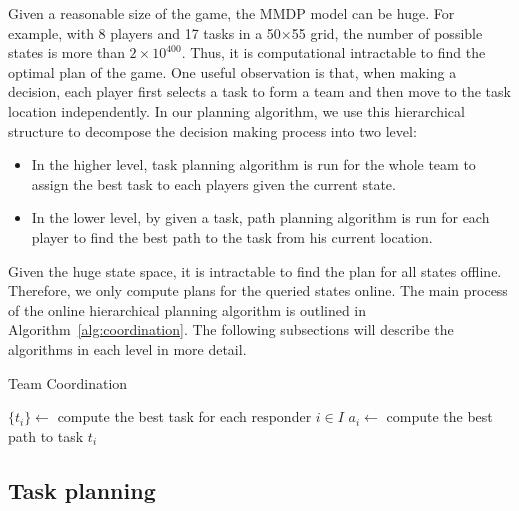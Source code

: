 Given a reasonable size of the game, the MMDP model can be huge.
For example, with 8 players and 17 tasks in a 50$\times$55 grid,
the number of possible states is more than $2\times 10^{400}$.
Thus, it is computational intractable to find the optimal plan of
the game. One useful observation is that, when making a decision,
each player first selects a task to form a team and then move to
the task location independently. In our planning algorithm, we use
this hierarchical structure to decompose the decision making
process into two level:
\begin{itemize}
  \item In the higher level, task planning algorithm is run for
      the whole team to assign the best task to each players
      given the current state.
  \item In the lower level, by given a task, path planning
      algorithm is run for each player to find the best path to
      the task from his current location.
\end{itemize}
Given the huge state space, it is intractable to find the plan for
all states offline. Therefore, we only compute plans for the
queried states online. The main process of the online hierarchical
planning algorithm is outlined in Algorithm~\ref{alg:coordination}.
The following subsections will describe the algorithms in each
level in more detail.

\begin{algorithm}[t]
  \caption{Team Coordination}
  $\{ t_i \} \gets$ compute the best task for each responder $i\in I$ \;
   {
    $a_i \gets$ compute the best path to task $t_i$ \;
  }
  \label{alg:coordination}
\end{algorithm}

\subsection{Task planning}
\label{sec:taskplanning}

